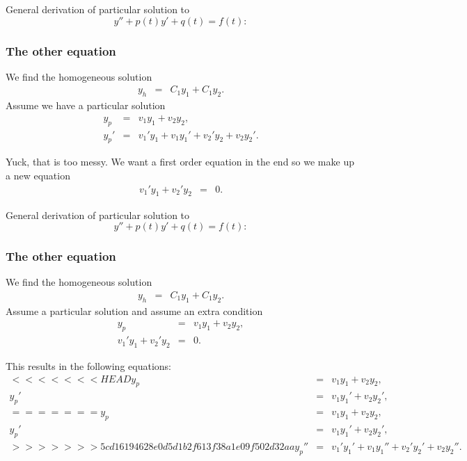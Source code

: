 \begin{frame}
General derivation of particular solution to $$y''+p(t)y'+q(t)=f(t):$$  
  \frametitle{The other equation}

  We find the homogeneous solution 
  \begin{eqnarray*}
    y_h & = & C_1  y_1 + C_1 y_2. 
  \end{eqnarray*}
  Assume we have a particular solution
  \begin{eqnarray*}
    y_p & = & v_1 y_1 + v_2 y_2, \\
    y_p' & = & v_1' y_1 + v_1 y_1' + v_2' y_2 + v_2 y_2'. 
  \end{eqnarray*}

  Yuck, that is too messy. We want a first order equation in the end
  so {\color{red}we make up a new equation
  \begin{eqnarray}
    \label{eqn:firstConstraint}
    v_1' y_1 + v_2' y_2 & = & 0.
  \end{eqnarray}}

\end{frame}


\begin{frame}
General derivation of particular solution to $$y''+p(t)y'+q(t)=f(t):$$  
  \frametitle{The other equation}

  We find the homogeneous solution 
  \begin{eqnarray*}
    y_h & = & C_1  y_1 + C_1 y_2. 
  \end{eqnarray*}
  Assume  a particular solution and assume an extra condition
  \begin{eqnarray*}
    y_p & = & v_1 y_1 + v_2 y_2, \\
    v_1' y_1 + v_2' y_2 & = & 0.
  \end{eqnarray*}


  This results in the following equations:
  \begin{eqnarray*}
<<<<<<< HEAD
    y_p & = & v_1 y_1 + v_2 y_2, \\
    y_p' & = & v_1 y_1' + v_2 y_2', \\
=======
    y_p   & = & v_1 y_1 + v_2 y_2, \\
    y_p'  & = & v_1 y_1' + v_2 y_2', \\
>>>>>>> 5cd16194628e0d5d1b2f613f38a1e09f502d32aa
    y_p'' & = & v_1' y_1' + v_1 y_1'' + v_2' y_2' + v_2 y_2''. 
  \end{eqnarray*}


\end{frame}





